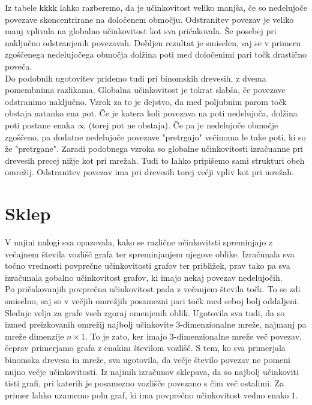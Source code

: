 \documentclass[a4paper, 16pt]{article}
\begin{document}
Iz tabele kkkk lahko razberemo, da je učinkovitost veliko manjša, če so nedelujoče povezave skoncentrirane na določenem območju. Odstranitev povezav je veliko manj vplivala na globalno učinkovitost kot sva pričakovala.
Še posebej pri naključno odstranjenih povezavah. Dobljen rezultat je smiselen, saj se v primeru zgoščenega nedelujočega območja dolžina poti med določenimi pari točk drastično poveča. \\
Do podobnih ugotovitev pridemo tudi pri binomskih drevesih, z dvema pomembnima razlikama. Globalna učinkovitost je tokrat slabša, če povezave odstranimo naključno. Vzrok za to je dejstvo, da med poljubnim parom točk obstaja natanko ena pot.
Če je katera koli povezava na poti nedelujoča, dolžina poti postane enaka $\infty$ (torej pot ne obstaja). Če pa je nedelujoče območje zgoščeno, pa dodatne nedelujoče povezave "pretrgajo" večinoma le take poti, ki so že "pretrgane". 
Zaradi podobnega vzroka so globalne učinkovitosti izračuanne pri drevesih precej nižje kot pri mrežah. Tudi to lahko pripišemo sami strukturi obeh omrežij. Odstranitev povezav ima pri drevesih torej većji vpliv
kot pri mrežah.

\section{Sklep}
V najini nalogi sva opazovala, kako se različne učinkovitsti spreminjajo z večajnem števila vozlišč grafa ter spreminjanjem njegove oblike. Izračunala sva točno vrednosti povprečne učinkovitosti grafov ter približek,
prav tako pa sva izračunala gobalno učinkovitost grafov, ki imajo nekaj povezav nedelujočih.\\


Po pričakovanjih povprečna učinkovitost pada z večanjem števila točk.
To se zdi smiselno, saj so v večjih omrežjih posamezni pari točk med seboj bolj oddaljeni.
Slednje velja za grafe vseh zgoraj omenjenih oblik. 
Ugotovila sva tudi, da so izmed preizkovanih omrežij najbolj učinkovite 3-dimenzionalne mreže, 
najmanj pa mreže dimenzije $n \times 1$. To je zato, ker imajo 3-dimenzionalne mreže več povezav, čeprav primerjamo grafa z enakim številom vozlišč.
S tem, ko sva primerjala binomska drevesa in mreže, sva ugotovila, da večje število povezav ne pomeni nujno večje učinkovitosti. 
Iz najinih izračunov sklepava, da so najbolj učinkoviti tisti grafi, pri katerih je posamezno vozlišče povezano s čim več ostalimi. 
Za primer lahko uzamemo poln graf, ki ima povprečno učinkovitost vedno enako $1$.\\
\end{document}
